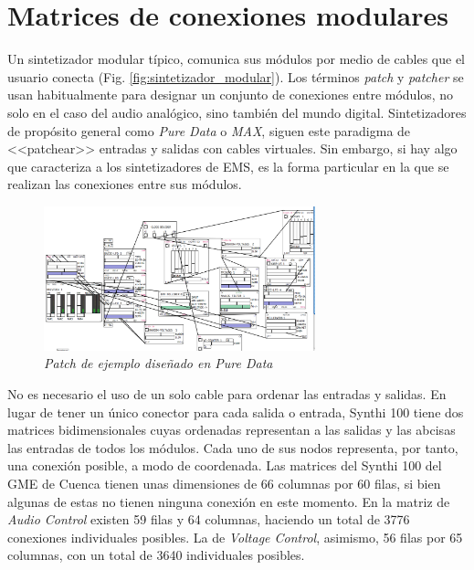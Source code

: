\section{Matrices de conexiones modulares}

Un sintetizador modular típico, comunica sus módulos por medio de cables que el usuario conecta (Fig. \ref{fig:sintetizador_modular}). Los términos \textit{patch} y \textit{patcher} se usan habitualmente para designar un conjunto de conexiones entre módulos, no solo en el caso del audio analógico, sino también del mundo digital. Sintetizadores de propósito general como \textit{Pure Data} o \textit{MAX}, siguen este paradigma de <<patchear>> entradas y salidas con cables virtuales. Sin embargo, si hay algo que caracteriza a los sintetizadores de EMS, es la forma particular en la que se realizan las conexiones entre sus módulos. 
	
\begin{figure}
	\centering
	\includegraphics[width=0.7\textwidth]{images/pd_patch_example}
	\caption[\textit{Patch de ejemplo diseñado en \textit{Pure Data}}]{\textit{Patch de ejemplo diseñado en \textit{Pure Data}}}
	\label{fig:pd_patch_example}
\end{figure}
	

No es necesario el uso de un solo cable para ordenar las entradas y salidas. En lugar de tener un único conector para cada salida o entrada, Synthi 100 tiene dos matrices bidimensionales cuyas ordenadas representan a las salidas y las abcisas las entradas de todos los módulos. Cada uno de sus nodos representa, por tanto, una conexión posible, a modo de coordenada. Las matrices del Synthi 100 del GME de Cuenca tienen unas dimensiones de 66 columnas por 60 filas, si bien algunas de estas no tienen ninguna conexión en este momento. En la matriz de \textit{Audio Control} existen 59 filas y 64 columnas, haciendo un total de 3776 conexiones individuales posibles. La de \textit{Voltage Control}, asimismo, 56 filas por 65 columnas, con un total de 3640 individuales posibles.


